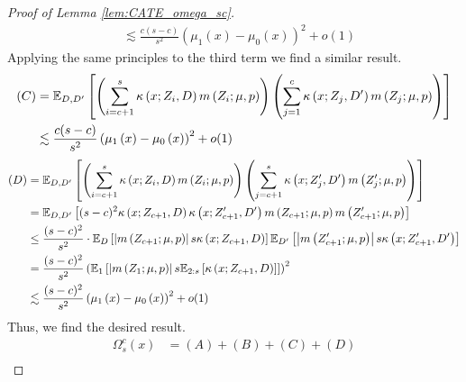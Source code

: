 \begin{proof}[Proof of Lemma \ref{lem:CATE_omega_sc}]
\begin{equation}
\begin{aligned}
			& \lesssim \frac{c(s-c)}{s^2}\left(\mu_{1}\left(x\right) - \mu_{0}\left(x\right)\right)^2  + o(1)
		\end{aligned}
	\end{equation}
	Applying the same principles to the third term we find a similar result.
	\begin{equation}
		\begin{aligned}
			(C)
			& = \mathbb{E}_{D, D^{\prime}}\left[\left(\sum_{i = c + 1}^{s} \kappa\left(x; Z_{i}, D\right) m\left(Z_{i}; \mu, p\right)\right)
            \left(\sum_{j = 1}^{c} \kappa\left(x; Z_{j}, D^{\prime}\right) m\left(Z_{j}; \mu, p\right)\right)\right]\\
			& \lesssim \frac{c(s-c)}{s^2}\left(\mu_{1}\left(x\right) - \mu_{0}\left(x\right)\right)^2  + o(1)
		\end{aligned}
	\end{equation}
	\begin{equation}
		\begin{aligned}
			(D)
			& = \mathbb{E}_{D, D^{\prime}}\left[\left(\sum_{i = c + 1}^{s} \kappa\left(x; Z_{i}, D\right) m\left(Z_{i}; \mu, p\right)\right)
            \left(\sum_{j = c + 1}^{s} \kappa\left(x; Z_{j}^{\prime}, D^{\prime}\right) m\left(Z_{j}^{\prime}; \mu, p\right)\right)\right] \\
			& = \mathbb{E}_{D, D^{\prime}}\left[(s-c)^2 \kappa\left(x; Z_{c+1}, D\right)\kappa\left(x; Z_{c+1}^{\prime}, D^{\prime}\right)
			 m\left(Z_{c+1}; \mu, p\right)  m\left(Z_{c+1}^{\prime}; \mu, p\right)\right] \\
			 & \leq \frac{(s-c)^2}{s^2} \cdot \mathbb{E}_{D}\left[\left|m\left(Z_{c+1}; \mu, p\right)\right| s \kappa\left(x; Z_{c+1}, D\right)\right]
			 \mathbb{E}_{D^{\prime}}\left[\left|m\left(Z_{c+1}^{\prime}; \mu, p\right)\right| s \kappa\left(x; Z_{c+1}^{\prime}, D^{\prime}\right) \right]\\
			 & = \frac{(s-c)^2}{s^2} \left(\mathbb{E}_{1}\left[\left|m\left(Z_{1}; \mu, p\right)\right| s \mathbb{E}_{2:s}\left[\kappa\left(x; Z_{c+1}, D\right)\right]\right]\right)^2 \\
			 & \lesssim \frac{(s-c)^2}{s^2}\left(\mu_{1}\left(x\right) - \mu_{0}\left(x\right)\right)^2  + o(1)
		\end{aligned}
	\end{equation}
	Thus, we find the desired result.
	\begin{equation}
		\begin{aligned}
			\Omega_{s}^{c}\left(x\right)
			& = (A) + (B) + (C) + (D) \\

\end{aligned}
\end{equation}
\end{proof}
